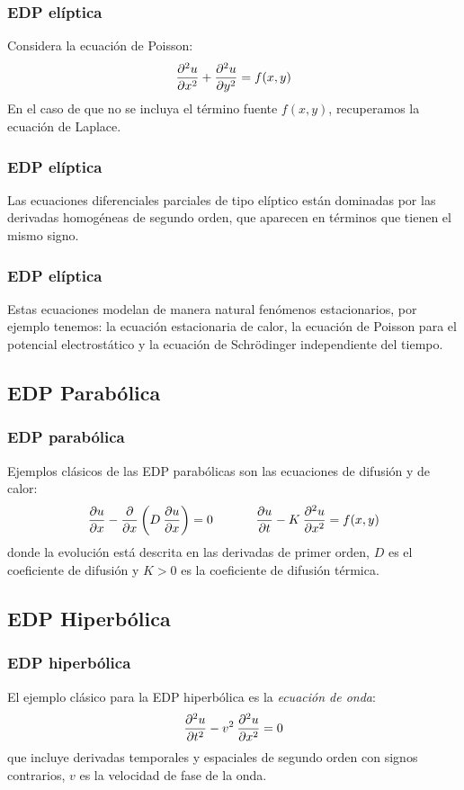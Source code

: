 \documentclass[12pt]{beamer}
\begin{document}
\begin{frame}
\frametitle{EDP elíptica}
Considera la ecuación de Poisson:
\pause
\begin{align*}
\pdv[2]{u}{x} + \pdv[2]{u}{y} = f (x, y)
\end{align*}
En el caso de que no se incluya el término fuente $f (x, y)$, recuperamos la ecuación de Laplace.
\end{frame}
\begin{frame}
\frametitle{EDP elíptica}
Las ecuaciones diferenciales parciales de tipo elíptico están dominadas por las derivadas homogéneas de segundo orden, que aparecen en términos que tienen el mismo signo.
\end{frame}
\begin{frame}
\frametitle{EDP elíptica}
Estas ecuaciones modelan de manera natural fenómenos estacionarios, por ejemplo tenemos: la ecuación estacionaria de calor, la ecuación de Poisson para el potencial electrostático y la ecuación de Schrödinger independiente del tiempo.
\end{frame}

\subsection{EDP Parabólica}

\begin{frame}
\frametitle{EDP parabólica}
Ejemplos clásicos de las EDP parabólicas son las ecuaciones de difusión y de calor:
\pause
\begin{align*}
\pdv{u}{x} - \pdv{x} \left( D \: \pdv{u}{x} \right) = 0 \hspace{1.2cm} \pdv{u}{t} - K \: \pdv[2]{u}{x}  = f (x,y)
\end{align*}
\pause
donde la evolución está descrita en las derivadas de primer orden, $D$ es el coeficiente de difusión y $K > 0$ es la coeficiente de difusión térmica.
\end{frame}

\subsection{EDP Hiperbólica}

\begin{frame}
\frametitle{EDP hiperbólica}
El ejemplo clásico para la EDP hiperbólica es la \emph{ecuación de onda}:
\pause
\begin{align*}
\pdv[2]{u}{t}  - v^{2} \: \pdv[2]{u}{x} = 0
\end{align*}
que incluye derivadas temporales y espaciales de segundo orden con signos contrarios, $v$ es la velocidad de fase de la onda.
\end{frame}
\end{document}
